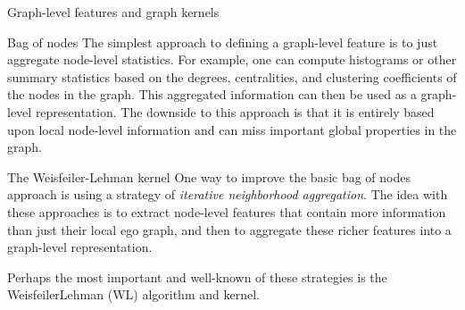 \documentclass[10pt, aspectratio=169, compress, protectframetitle, handout]{beamer}
\begin{document}
\begin{frame}{Graph-level features and graph kernels}

    \begin{block}{Bag of nodes}
        The simplest approach to defining a graph-level feature is to just aggregate node-level statistics. For example, one can compute histograms or other summary statistics based on the degrees, centralities, and clustering coefficients of the nodes in the graph. This aggregated information can then be used as a graph-level representation. The downside to this approach is that it is entirely based upon local node-level information and can miss important global properties in the graph.
    \end{block}
    
    \begin{block}{The Weisfeiler-Lehman kernel}
        One way to improve the basic bag of nodes approach is using a strategy of \emph{iterative neighborhood aggregation}. The idea with these approaches is to extract node-level features that contain more information than just their local ego graph, and then to aggregate these richer features into a graph-level representation.

        Perhaps the most important and well-known of these strategies is the WeisfeilerLehman (WL) algorithm and kernel.
    \end{block}
    
\end{frame}
\end{document}
